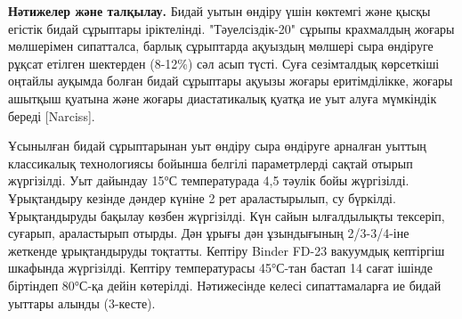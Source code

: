 \begin{multicols}{2}
{\bfseries Нәтижелер және талқылау.} Бидай уытын өндіру үшін көктемгі және
қысқы егістік бидай сұрыптары іріктелінді. "Тәуелсіздік-20" сұрыпы
крахмалдың жоғары мөлшерімен сипатталса, барлық сұрыптарда ақуыздың
мөлшері сыра өндіруге рұқсат етілген шектерден (8-12\%) сәл асып түсті.
Суға сезімталдық көрсеткіші оңтайлы ауқымда болған бидай сұрыптары
ақуызы жоғары еритімділікке, жоғары ашытқыш қуатына және жоғары
диастатикалық қуатқа ие уыт алуға мүмкіндік береді {[}Narciss{]}.

Ұсынылған бидай сұрыптарынан уыт өндіру сыра өндіруге арналған уыттың
классикалық технологиясы бойынша белгілі параметрлерді сақтай отырып
жүргізілді. Уыт дайындау 15°С температурада 4,5 тәулік бойы жүргізілді.
Ұрықтандыру кезінде дәндер күніне 2 рет араластырылып, су бүркілді.
Ұрықтандыруды бақылау көзбен жүргізілді. Күн сайын ылғалдылықты
тексеріп, суғарып, араластырып отырды. Дән ұрығы дән ұзындығының
2/3-3/4-іне жеткенде ұрықтандыруды тоқтатты. Кептіру Binder FD-23
вакуумдық кептіргіш шкафында жүргізілді. Кептіру температурасы 45°С-тан
бастап 14 сағат ішінде біртіндеп 80°С-қа дейін көтерілді. Нәтижесінде
келесі сипаттамаларға ие бидай уыттары алынды (3-кесте).
\end{multicols}

